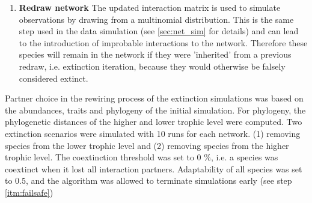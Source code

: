 \documentclass[12pt,a4paper]{article}
\begin{document}
\begin{enumerate}
	\item \label{itm:redraw} \textbf{Redraw network} {\small The updated interaction matrix is used to simulate observations by drawing from a multinomial distribution. This is the same step used in the data simulation (see \ref{sec:net_sim} for details) and can lead to the introduction of improbable interactions to the network. Therefore these species will remain in the network if they were 'inherited' from a previous redraw, i.e. extinction iteration, because they would otherwise be falsely considered extinct.}
	\end{enumerate}
			
Partner choice in the rewiring process of the extinction simulations was based on the abundances, traits and phylogeny of the initial simulation. For phylogeny, the phylogenetic distances of the higher and lower trophic level were computed. Two extinction scenarios were simulated with 10 runs for each network. (1) removing species from the lower trophic level and (2) removing species from the higher trophic level. The coextinction threshold was set to 0 \%, i.e. a species was coextinct when it lost all interaction partners. Adaptability of all species was set to 0.5, and the algorithm was allowed to terminate simulations early (see step \ref{itm:failsafe})
 
\end{document}
